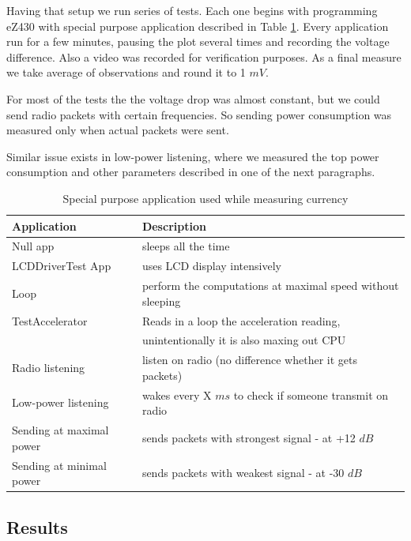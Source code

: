 Having that setup we run series of tests.
Each one begins with programming eZ430 with special purpose application described in Table \ref{tab:power-apps}.
Every application run for a few minutes, pausing the plot several times and recording the voltage difference.
Also a video was recorded for verification purposes.
As a final measure we take average of observations and round it to 1 $ mV $.

For most of the tests the the voltage drop was almost constant, but we could send radio packets with certain frequencies.
So sending power consumption was measured only when actual packets were sent.

Similar issue exists in low-power listening, where we measured the top power consumption and other parameters described in one of the next paragraphs.


\begin{table}
  \centering
    \begin{tabular}{|l|l|}
        \hline
    \textbf{Application} & \textbf{Description} \\ \hline
    Null app & sleeps all the time \\ \hline
    LCDDriverTest App & uses LCD display intensively \\ \hline
    Loop & perform the computations at maximal speed without sleeping \\ \hline
    TestAccelerator & Reads in a loop the acceleration reading, \\
    & unintentionally it is also maxing out CPU \\ \hline
    Radio listening & listen on radio (no difference whether it gets packets) \\ \hline
    Low-power listening & wakes every X $ ms $ to check if someone transmit on radio \\ \hline
    Sending at maximal power & sends packets with strongest signal - at +12 $ dB $ \\ \hline
    Sending at minimal power & sends packets with weakest signal - at -30 $ dB $ \\ \hline
    \end{tabular}
  \caption{Special purpose application used while measuring currency}
  \label{tab:power-apps}
\end{table}

\subsection{Results}

